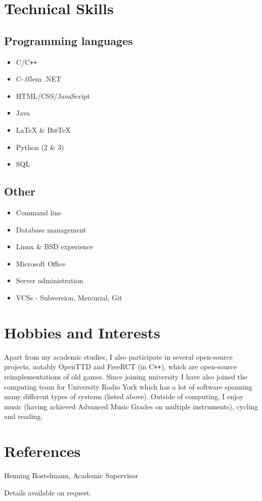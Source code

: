 \documentclass[11pt,a4paper]{article}
\newcommand{\cpp}{C{}\texttt{++}}
\newcommand{\cs}{\settoheight{\dimen0}{C}C\kern-.05em \resizebox{!}{\dimen0}{\raisebox{\depth}{\textbf{\#}}}}
\begin{document}
\section*{Technical Skills}
\begin{minipage}[t]{.45\textwidth}
\subsection*{Programming languages}
\begin{itemize}
  \item C/\cpp
  \item \cs.NET
  \item HTML/CSS/JavaScript
  \item Java
  \item \LaTeX{} \& \textsc{Bib}\TeX
  \item Python (2 \& 3)
  \item SQL
\end{itemize}
\end{minipage}
\hspace{0.5cm}
\begin{minipage}[t]{.45\textwidth}
\subsection*{Other}
\begin{itemize}
  \item Command line
  \item Database management
  \item Linux \& BSD experience
  \item Microsoft Office
  \item Server administration
  \item VCSs - Subversion, Mercurial, Git
\end{itemize}
\end{minipage}

\section*{Hobbies and Interests}
Apart from my academic studies, I also participate in several open-source
projects, notably OpenTTD and FreeRCT (in \cpp), which are open-source reimplementations
of old games. Since joining university I have also joined the computing team for
University Radio York which has a lot of software spanning many different types
of systems (listed above). Outside of computing, I enjoy music (having achieved
Advanced Music Grades on multiple instruments), cycling and reading.

\section*{References}
Henning Bostelmann, Academic Supervisor

Details available on request.
\end{document}
